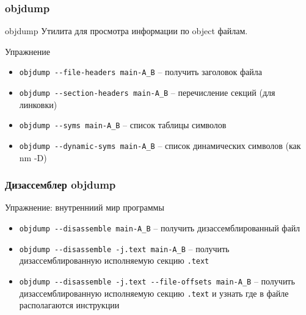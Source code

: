 
\begin{frame}
	\frametitle{objdump}

	\begin{block}{objdump}
		Утилита для просмотра информации по object файлам.
	\end{block}

	\pause

	\begin{block}{Упражнение}
		\begin{itemize}
			\item {\tt objdump -{}-file-headers main-A\_B} -- получить заголовок файла
			\item {\tt objdump -{}-section-headers main-A\_B} -- перечисление секций (для линковки)
			\item {\tt objdump -{}-syms main-A\_B} -- список таблицы символов
			\item {\tt objdump -{}-dynamic-syms main-A\_B} -- список динамических символов (как nm -D)
		\end{itemize}

	\end{block}
\end{frame}


\begin{frame}
	\frametitle{Дизассемблер objdump}

	\begin{block}{Упражнение: внутренниий мир программы}
		\begin{itemize}
			\item {\tt objdump -{}-disassemble main-A\_B} -- получить дизассемблированный файл
			\item {\tt objdump -{}-disassemble -j.text main-A\_B} -- 
				получить дизассемблированную исполняемую секцию {\tt .text}
			\item {\tt objdump -{}-disassemble -j.text -{}-file-offsets main-A\_B} -- 
				получить дизассемблированную исполняемую секцию {\tt .text} 
				и узнать где в файле располагаются инструкции
		\end{itemize}
	\end{block}
\end{frame}

